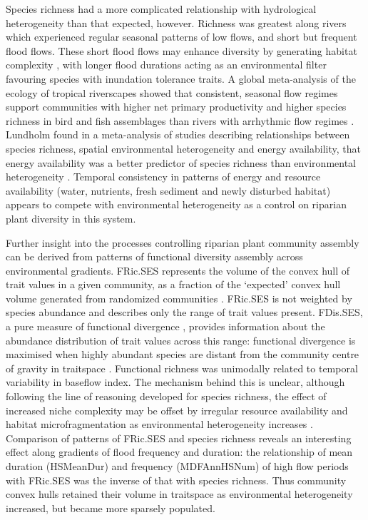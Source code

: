 \documentclass[openright,12pt,a4paper]{memoir}
\begin{document}
Species richness had a more complicated relationship with hydrological heterogeneity than that expected, however. Richness was greatest along rivers which experienced regular seasonal patterns of low flows, and short but frequent flood flows. These short flood flows may enhance diversity by generating habitat complexity \citep{Tabacchi1998, Bendix2000}, with longer flood durations acting as an environmental filter favouring species with inundation tolerance traits. A global meta-analysis of the ecology of tropical riverscapes showed that consistent, seasonal flow regimes support communities with higher net primary productivity and higher species richness in bird and fish assemblages than rivers with arrhythmic flow regimes \citep{Jardine2015}. Lundholm found in a meta-analysis of studies describing relationships between species richness, spatial environmental heterogeneity and energy availability, that energy availability was a better predictor of species richness than environmental heterogeneity \citep{Lundholm2009}. Temporal consistency in patterns of energy and resource availability (water, nutrients, fresh sediment and newly disturbed habitat) appears to compete with environmental heterogeneity as a control on riparian plant diversity in this system. 

Further insight into the processes controlling riparian plant community assembly can be derived from patterns of functional diversity assembly across environmental gradients. FRic.SES represents the volume of the convex hull of trait values in a given community, as a fraction of the ‘expected’ convex hull volume generated from randomized communities \citep{Mason2013}. FRic.SES is not weighted by species abundance and describes only the range of trait values present. FDis.SES, a pure measure of functional divergence \citep{Mason2013}, provides information about the abundance distribution of trait values across this range: functional divergence is maximised when highly abundant species are distant from the community centre of gravity in traitspace \citep{Mouchet2010}. Functional richness was unimodally related to temporal variability in baseflow index. The mechanism behind this is unclear, although following the line of reasoning developed for species richness, the effect of increased niche complexity may be offset by irregular resource availability and habitat microfragmentation as environmental heterogeneity increases \citep{Laanisto2013}. Comparison of patterns of FRic.SES and species richness reveals an interesting effect along gradients of flood frequency and duration: the relationship of mean duration (HSMeanDur) and frequency (MDFAnnHSNum) of high flow periods with FRic.SES was the inverse of that with species richness. Thus community convex hulls retained their volume in traitspace as environmental heterogeneity increased, but became more sparsely populated. 
\end{document}
